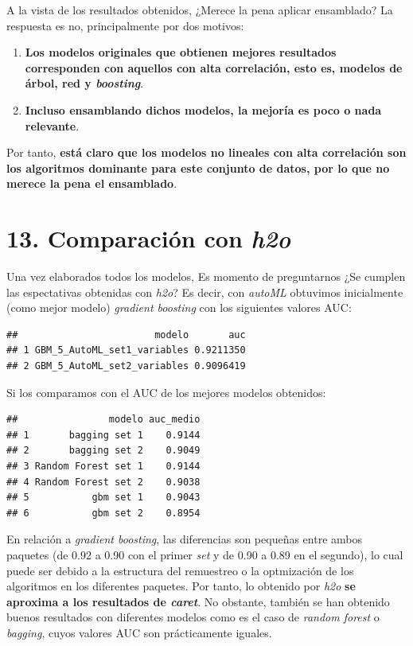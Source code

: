 \documentclass[
]{article}
\begin{document}
A la vista de los resultados obtenidos, ¿Merece la pena aplicar
ensamblado? La respuesta es no, principalmente por dos motivos:

\begin{enumerate}
\def\labelenumi{\arabic{enumi}.}
\item
  \textbf{Los modelos originales que obtienen mejores resultados
  corresponden con aquellos con alta correlación, esto es, modelos de
  árbol, red y \emph{boosting}}.
\item
  \textbf{Incluso ensamblando dichos modelos, la mejoría es poco o nada
  relevante}.
\end{enumerate}

Por tanto, \textbf{está claro que los modelos no lineales con alta
correlación son los algoritmos dominante para este conjunto de datos,
por lo que no merece la pena el ensamblado}.

\hypertarget{comparaciuxf3n-con-h2o}{%
\section{\texorpdfstring{13. Comparación con
\emph{h2o}}{13. Comparación con h2o}}\label{comparaciuxf3n-con-h2o}}

Una vez elaborados todos los modelos, Es momento de preguntarnos ¿Se
cumplen las espectativas obtenidas con \emph{h2o}? Es decir, con
\emph{autoML} obtuvimos inicialmente (como mejor modelo) \emph{gradient
boosting} con los siguientes valores AUC:

\begin{verbatim}
##                        modelo       auc
## 1 GBM_5_AutoML_set1_variables 0.9211350
## 2 GBM_5_AutoML_set2_variables 0.9096419
\end{verbatim}

Si los comparamos con el AUC de los mejores modelos obtenidos:

\begin{verbatim}
##                modelo auc_medio
## 1       bagging set 1    0.9144
## 2       bagging set 2    0.9049
## 3 Random Forest set 1    0.9144
## 4 Random Forest set 2    0.9038
## 5           gbm set 1    0.9043
## 6           gbm set 2    0.8954
\end{verbatim}

En relación a \emph{gradient boosting}, las diferencias son pequeñas
entre ambos paquetes (de 0.92 a 0.90 con el primer \emph{set} y de 0.90
a 0.89 en el segundo), lo cual puede ser debido a la estructura del
remuestreo o la optmización de los algoritmos en los diferentes
paquetes. Por tanto, lo obtenido por \emph{h2o} \textbf{se aproxima a
los resultados de \emph{caret}}. No obstante, también se han obtenido
buenos resultados con diferentes modelos como es el caso de \emph{random
forest} o \emph{bagging}, cuyos valores AUC son prácticamente iguales.
\end{document}

